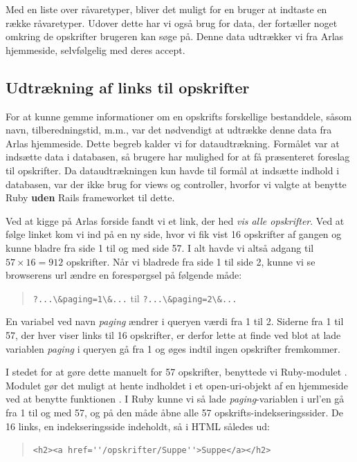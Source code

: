 Med en liste over råvaretyper, bliver det muligt for en bruger at indtaste en række råvaretyper. Udover dette har vi også brug for data, der fortæller noget omkring de opskrifter brugeren kan søge på. Denne data udtrækker vi fra Arlas hjemmeside, selvfølgelig med deres accept.

\subsection{Udtrækning af links til opskrifter}

For at kunne gemme informationer om en opskrifts forskellige bestanddele, såsom navn, tilberedningstid, m.m., var det nødvendigt at udtrække denne data fra Arlas hjemmeside. Dette begreb kalder vi for dataudtrækning. Formålet var at indsætte data i databasen, så brugere har mulighed for at få præsenteret foreslag til opskrifter. Da dataudtrækningen kun havde til formål at indsætte indhold i databasen, var der ikke brug for views og controller, hvorfor vi valgte at benytte Ruby \textbf{uden} Rails frameworket til dette.

Ved at kigge på Arlas forside fandt vi et link, der hed \textit{vis alle opskrifter}. Ved at følge linket kom vi ind på en ny side, hvor vi fik vist 16 opskrifter af gangen og kunne bladre fra side 1 til og med side 57. I alt havde vi altså adgang til $57 \times 16 = 912$ opskrifter. Når vi bladrede fra side 1 til side 2, kunne vi se browserens url ændre en forespørgsel på følgende måde:

\begin{quote}
\lstinline{?...\&paging=1\&...} til \lstinline{?...\&paging=2\&...}
\end{quote}

En variabel ved navn \textit{paging} ændrer i queryen værdi fra 1 til 2. Siderne fra 1 til 57, der hver viser links til 16 opskrifter, er derfor lette at finde ved blot at lade variablen \textit{paging} i queryen gå fra 1 og øges indtil ingen opskrifter fremkommer.

I stedet for at gøre dette manuelt for 57 opskrifter, benyttede vi Ruby-modulet . Modulet gør det muligt at hente indholdet i et open-uri-objekt af en hjemmeside ved at benytte funktionen . I Ruby kunne vi så lade \textit{paging}-variablen i url'en gå fra 1 til og med 57, og på den måde åbne alle 57 opskrifts-indekseringssider. De 16 links, en indekseringsside indeholdt, så i HTML således ud:

\begin{quote}
  \lstinline{<h2><a href=''/opskrifter/Suppe''>Suppe</a></h2>}
\end{quote}

